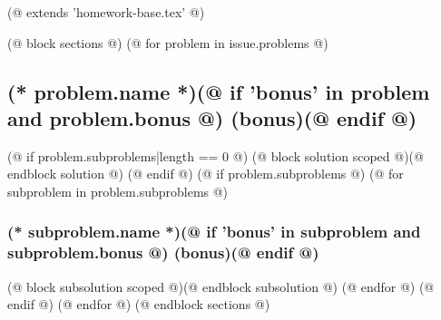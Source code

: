 (@ extends 'homework-base.tex' @)

(@ block sections @)
    (@ for problem in issue.problems @)
        \subsection{(* problem.name *)(@ if 'bonus' in problem and problem.bonus @) (bonus)(@ endif @)}
        \label{sec:(* problem.id *)}
        (@ if problem.subproblems|length == 0 @)
            (@ block solution scoped @)(@ endblock solution @)
        (@ endif @)
        (@ if problem.subproblems @)
            (@ for subproblem in problem.subproblems @)
                \subsubsection{(* subproblem.name *)(@ if 'bonus' in subproblem and subproblem.bonus @) (bonus)(@ endif @)}
                \label{sec:(* problem.id*)-(* subproblem.id *)}
                (@ block subsolution scoped @)(@ endblock subsolution @)
            (@ endfor @)
        (@ endif @)
    (@ endfor @)
(@ endblock sections @)

